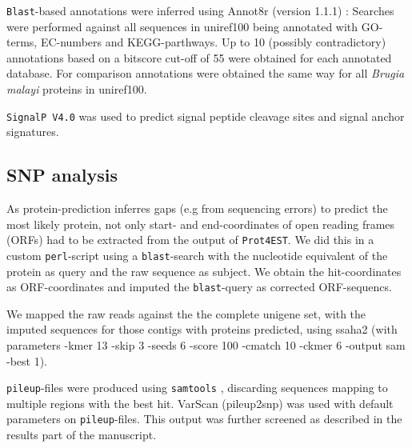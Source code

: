 \documentclass[10pt]{bmc_article}
\newenvironment{bmcformat}{\begin{raggedright}\baselineskip20pt\sloppy\setboolean{publ}{false}}{\end{raggedright}\baselineskip20pt\sloppy}
\begin{document}
\begin{bmcformat}
\texttt{Blast}-based annotations were inferred using Annot8r (version
1.1.1) \cite{schmid_annot8r:_2008}: Searches were performed against
all sequences in uniref100 \cite{pmid18836194} being annotated with
GO-terms, EC-numbers and KEGG-parthways. Up to 10 (possibly
contradictory) annotations based on a bitscore cut-off of 55 were
obtained for each annotated database.  For comparison annotations were
obtained the same way for all \textit{Brugia malayi} proteins in
uniref100.


\texttt{SignalP V4.0} \cite{pmid21959131} was used to predict signal
peptide cleavage sites and signal anchor signatures.

\subsection*{SNP analysis}

As protein-prediction inferres gaps (e.g from sequencing errors) to
predict the most likely protein, not only start- and end-coordinates
of open reading frames (ORFs) had to be extracted from the output of
\texttt{Prot4EST}. We did this in a custom \texttt{perl}-script using
a \texttt{blast}-search with the nucleotide equivalent of the protein
as query and the raw sequence as subject. We obtain the
hit-coordinates as ORF-coordinates and imputed the
\texttt{blast}-query as corrected ORF-sequencs.

We mapped the raw reads against the the complete unigene set, with the
imputed sequences for those contigs with proteins predicted, using
ssaha2 (with parameters -kmer 13 -skip 3 -seeds 6 -score 100 -cmatch
10 -ckmer 6 -output sam -best 1).

\texttt{pileup}-files were produced using \texttt{samtools}
\cite{journals/bioinformatics/LiHWFRHMAD09}, discarding sequences
mapping to multiple regions with the best hit. VarScan
\cite{pmid19542151} (pileup2snp) was used with default parameters on
\texttt{pileup}-files. This output was further screened as described
in the results part of the manuscript.




\end{bmcformat}
\end{document}
